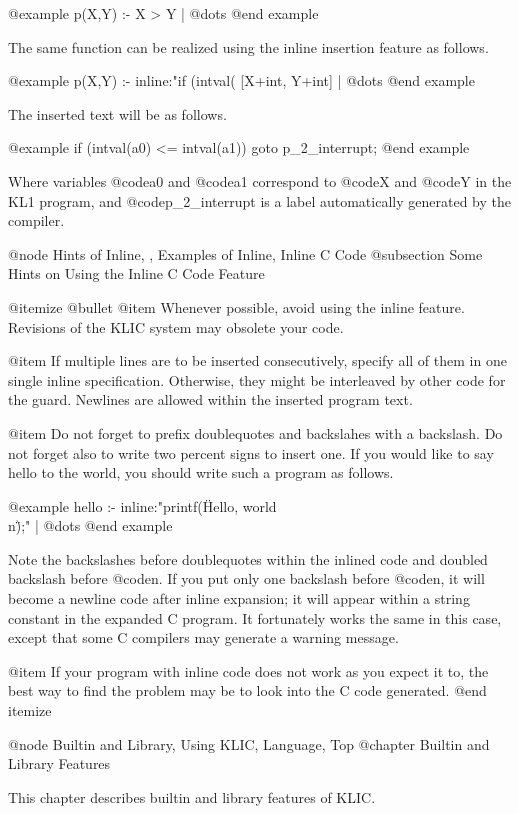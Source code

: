{@example
p(X,Y) :- X > Y | @dots{}
@end example

The same function can be realized using the inline insertion feature
as follows.

@example
p(X,Y) :-
  inline:"if (intval(%
    [X+int, Y+int] | @dots{}
@end example

The inserted text will be as follows.

@example
if (intval(a0) <= intval(a1)) goto p_2_interrupt;
@end example

Where variables @code{a0} and @code{a1} correspond to @code{X} and
@code{Y} in the KL1 program, and @code{p_2_interrupt} is a label
automatically generated by the compiler.

@node Hints of Inline,  , Examples of Inline, Inline C Code
@subsection Some Hints on Using the Inline C Code Feature

@itemize @bullet
@item
Whenever possible, avoid using the inline feature.  Revisions of the
KLIC system may obsolete your code.

@item
If multiple lines are to be inserted consecutively, specify all of them
in one single inline specification.  Otherwise, they might be
interleaved by other code for the guard.  Newlines are allowed within
the inserted program text.

@item
Do not forget to prefix doublequotes and backslahes with a backslash.
Do not forget also to write two percent signs to insert one.
If you would like to say hello to the world, you should write such a
program as follows.

@example
hello :-
    inline:"printf(\"Hello, world\\n\");" |
    @dots{}
@end example

Note the backslashes before doublequotes within the inlined code and
doubled backslash before @code{n}.  If you put only one backslash before
@code{n}, it will become a newline code after inline expansion; it will
appear within a string constant in the expanded C program.  It
fortunately works the same in this case, except that some C compilers
may generate a warning message.

@item
If your program with inline code does not work as you expect it to, the
best way to find the problem may be to look into the C code generated.
@end itemize

@node Builtin and Library, Using KLIC, Language, Top
@chapter Builtin and Library Features

This chapter describes builtin and library features of KLIC.

}
